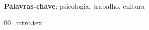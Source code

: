 \documentclass[
    article,
    11pt,
    oneside,
    a4paper,
    english,
    brazilian,                     %
    sumario=tradicional
    ]{abntex2}
\begin{document}

\frenchspacing                  %

\maketitle

\begin{resumoumacoluna}
    \lipsum[5]
    \vspace{\onelineskip}
    \noindent
    \linebreak
    \textbf{Palavras-chave}: psicologia, trabalho, cultura
\end{resumoumacoluna}

\textual

{00_intro.tex}



\postextual


\end{document}
